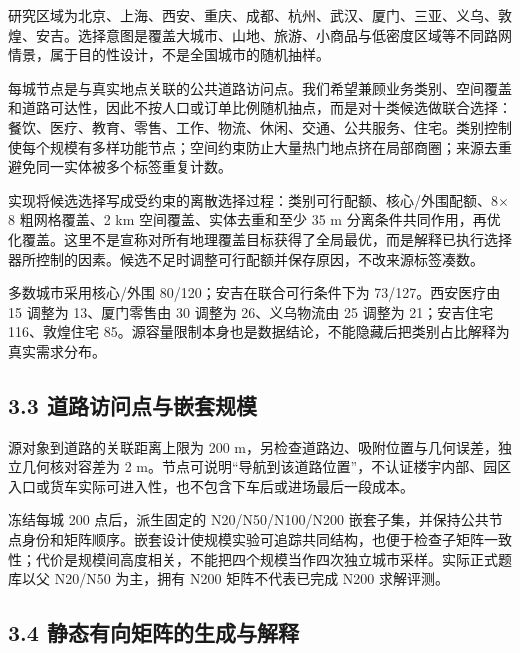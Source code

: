 \documentclass[UTF8,10pt,a4paper,fontset=fandol]{ctexart}
\begin{document}

研究区域为北京、上海、西安、重庆、成都、杭州、武汉、厦门、三亚、义乌、敦煌、安吉。选择意图是覆盖大城市、山地、旅游、小商品与低密度区域等不同路网情景，属于目的性设计，不是全国城市的随机抽样。


每城节点是与真实地点关联的公共道路访问点。我们希望兼顾业务类别、空间覆盖和道路可达性，因此不按人口或订单比例随机抽点，而是对十类候选做联合选择：餐饮、医疗、教育、零售、工作、物流、休闲、交通、公共服务、住宅。类别控制使每个规模有多样功能节点；空间约束防止大量热门地点挤在局部商圈；来源去重避免同一实体被多个标签重复计数。


实现将候选选择写成受约束的离散选择过程：类别可行配额、核心/\allowbreak{}外围配额、8\ensuremath{\times}8 粗网格覆盖、2 km 空间覆盖、实体去重和至少 35 m 分离条件共同作用，再优化覆盖。这里不是宣称对所有地理覆盖目标获得了全局最优，而是解释已执行选择器所控制的因素。候选不足时调整可行配额并保存原因，不改来源标签凑数。


多数城市采用核心/\allowbreak{}外围 80/\allowbreak{}120；安吉在联合可行条件下为 73/\allowbreak{}127。西安医疗由 15 调整为 13、厦门零售由 30 调整为 26、义乌物流由 25 调整为 21；安吉住宅 116、敦煌住宅 85。源容量限制本身也是数据结论，不能隐藏后把类别占比解释为真实需求分布。


\subsection*{3.3 道路访问点与嵌套规模}


源对象到道路的关联距离上限为 200 m，另检查道路边、吸附位置与几何误差，独立几何核对容差为 2 m。节点可说明“导航到该道路位置”，不认证楼宇内部、园区入口或货车实际可进入性，也不包含下车后或进场最后一段成本。


冻结每城 200 点后，派生固定的 N20/\allowbreak{}N50/\allowbreak{}N100/\allowbreak{}N200 嵌套子集，并保持公共节点身份和矩阵顺序。嵌套设计使规模实验可追踪共同结构，也便于检查子矩阵一致性；代价是规模间高度相关，不能把四个规模当作四次独立城市采样。实际正式题库以父 N20/\allowbreak{}N50 为主，拥有 N200 矩阵不代表已完成 N200 求解评测。


\subsection*{3.4 静态有向矩阵的生成与解释}

\end{document}
